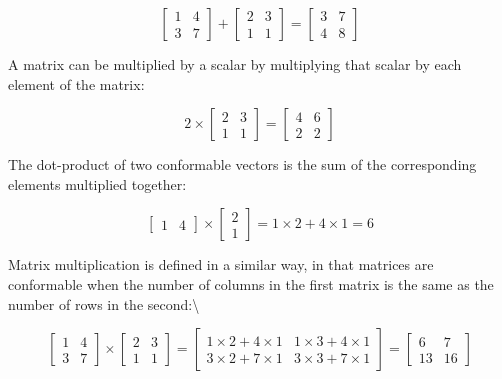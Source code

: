 \documentclass[]{book}
\theoremstyle{definition}
\theoremstyle{definition}
\theoremstyle{definition}
\theoremstyle{remark}
\begin{document}
\[
\begin{bmatrix} 1 & 4 \\ 3 & 7 \end{bmatrix} + 
\begin{bmatrix} 2 & 3 \\ 1 & 1 \end{bmatrix} = 
\begin{bmatrix} 3 & 7 \\ 4 & 8 \end{bmatrix}
\]

A matrix can be multiplied by a scalar by multiplying that scalar by
each element of the matrix:

\[
2 \times 
\begin{bmatrix} 2 & 3 \\ 1 & 1 \end{bmatrix} = 
\begin{bmatrix} 4 & 6 \\ 2 & 2 \end{bmatrix}
\]

The dot-product of two conformable vectors is the sum of the
corresponding elements multiplied together:

\[
\begin{bmatrix} 1 & 4  \end{bmatrix} \times 
\begin{bmatrix} 2 \\ 1 \end{bmatrix} = 
1 \times 2 + 4 \times 1 =
6
\]

Matrix multiplication is defined in a similar way, in that matrices are
conformable when the number of columns in the first matrix is the same
as the number of rows in the second:\textbackslash{}

\[
\begin{bmatrix} 1 & 4 \\ 3 & 7 \end{bmatrix} \times 
\begin{bmatrix} 2 & 3 \\ 1 & 1 \end{bmatrix} = 
\begin{bmatrix} 1 \times 2 + 4 \times 1 & 1 \times 3 + 4 \times 1 \\ 3 \times 2 + 7 \times 1 & 3 \times 3 + 7 \times 1 \end{bmatrix} = 
\begin{bmatrix} 6 & 7 \\ 13 & 16 \end{bmatrix}
\]
\end{document}
